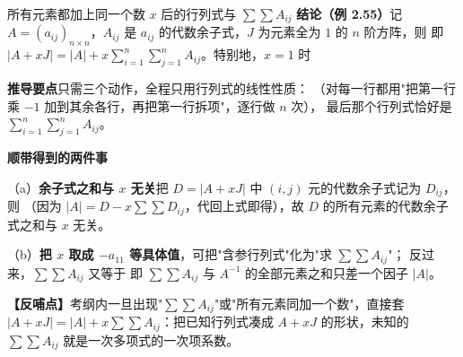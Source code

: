 \begin{fdeep}{所有元素都加上同一个数 $x$ 后的行列式与 $\sum\sum A_{ij}$}
\textbf{结论（例 2.55）}\quad 记 $A=(a_{ij})_{n\times n}$，$A_{ij}$ 是 $a_{ij}$ 的代数余子式，$J$ 为元素全为 $1$ 的 $n$ 阶方阵，则
即 $|A+xJ|=|A|+x\sum\limits_{i=1}^{n}\sum\limits_{j=1}^{n}A_{ij}$。特别地，$x=1$ 时

\textbf{推导要点}\quad 只需三个动作，全程只用行列式的线性性质：
（对每一行都用"把第一行乘 $-1$ 加到其余各行，再把第一行拆项"，逐行做 $n$ 次），
最后那个行列式恰好是 $\sum\limits_{i=1}^{n}\sum\limits_{j=1}^{n}A_{ij}$。

\textbf{顺带得到的两件事}

（a）\textbf{余子式之和与 $x$ 无关}\quad 把 $D=|A+xJ|$ 中 $(i,j)$ 元的代数余子式记为 $D_{ij}$，则
（因为 $|A|=D-x\sum\sum D_{ij}$，代回上式即得），故 $D$ 的所有元素的代数余子式之和与 $x$ 无关。

（b）\textbf{把 $x$ 取成 $-a_{11}$ 等具体值}，可把"含参行列式"化为"求 $\sum\sum A_{ij}$"；
反过来，$\sum\sum A_{ij}$ 又等于
即 $\sum\sum A_{ij}$ 与 $A^{-1}$ 的全部元素之和只差一个因子 $|A|$。

\textbf{【反哺点】}考纲内一旦出现"$\sum\sum A_{ij}$"或"所有元素同加一个数"，直接套 $|A+xJ|=|A|+x\sum\sum A_{ij}$：把已知行列式凑成 $A+xJ$ 的形状，未知的 $\sum\sum A_{ij}$ 就是一次多项式的一次项系数。
\end{fdeep}

